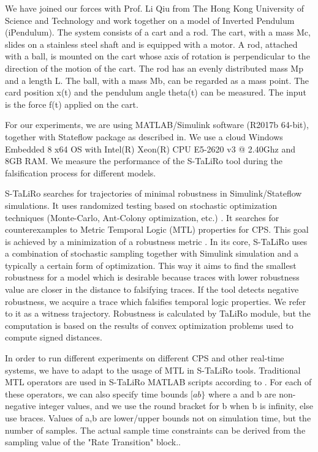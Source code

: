 We have joined our forces with Prof. Li Qiu from The Hong Kong University of Science and Technology and work together on a model of Inverted Pendulum (iPendulum). The system consists of a cart and a rod. The cart, with a mass Mc, slides on a stainless steel shaft and is equipped with a motor. A rod, attached with a ball, is mounted on the cart whose axis of rotation is perpendicular to the direction of the motion of the cart. The rod has an evenly distributed mass Mp and a length L. The ball, with a mass Mb, can be regarded as a mass point. The card position x(t) and the pendulum angle theta(t) can be measured. The input is the force f(t) applied on the cart.

For our experiments, we are using MATLAB/Simulink software (R2017b 64-bit), together with Stateflow package as described in. We use a cloud Windows Embedded 8 x64 OS with Intel(R) Xeon(R) CPU E5-2620 v3 @ 2.40Ghz and 8GB RAM. We measure the performance of the S-TaLiRo tool during the falsification process for different models.

S-TaLiRo searches for trajectories of minimal robustness in Simulink/Stateflow simulations. It uses randomized testing based on stochastic optimization techniques (Monte-Carlo, Ant-Colony optimization, etc.) \cite{Fainekos:AntColonies}. It searches for counterexamples to Metric Temporal Logic (MTL) properties for CPS. This goal is achieved by a minimization of a robustness metric \cite{Fainekos:RobustnessContinuousTime}. In its core, S-TaLiRo uses a combination of stochastic sampling together with Simulink simulation and a typically a certain form of optimization. This way it aims to find the smallest robustness for a model which is desirable because traces with lower robustness value are closer in the distance to falsifying traces. If the tool detects negative robustness, we acquire a trace which falsifies temporal logic properties. We refer to it as a witness trajectory. Robustness is calculated by TaLiRo module, but the computation is based on the results of convex optimization problems used to compute signed distances.

In order to run different experiments on different CPS and other real-time systems, we have to adapt to the usage of MTL in S-TaLiRo tools. Traditional MTL operators are used in S-TaLiRo MATLAB scripts according to . For each of these operators, we can also specify time bounds $[a b\}$ where a and b are non-negative integer values, and we use the round bracket for b when b is infinity, else use braces. Values of a,b are lower/upper bounds not on simulation time, but the number of samples. The actual sample time constraints can be derived from the sampling value of the "Rate Transition" block..

